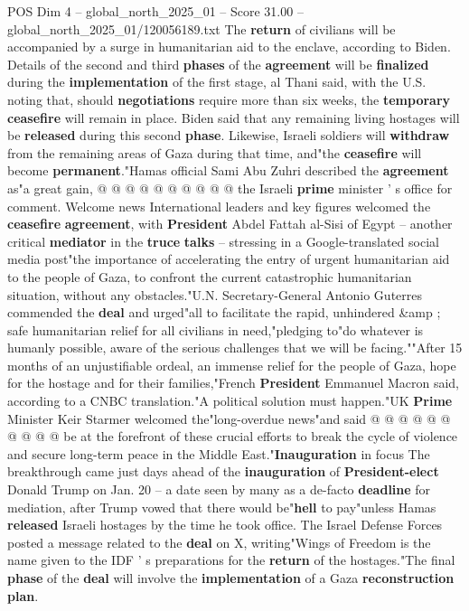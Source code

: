 \begin{textsample}{POS Dim 4 – global\_north\_2025\_01 – Score 31.00 – global\_north\_2025\_01/120056189.txt}
The \textbf{return} of civilians will be accompanied by a surge in humanitarian aid to the enclave, according to Biden.
Details of the second and third \textbf{phases} of the \textbf{agreement} will be \textbf{finalized} during the \textbf{implementation} of the first stage, al Thani said, with the U.S. noting that, should \textbf{negotiations} require more than six weeks, the \textbf{temporary} \textbf{ceasefire} will remain in place.
Biden said that any remaining living hostages will be \textbf{released} during this second \textbf{phase}.
Likewise, Israeli soldiers will \textbf{withdraw} from the remaining areas of Gaza during that time, and"the \textbf{ceasefire} will become \textbf{permanent}."Hamas official Sami Abu Zuhri described the \textbf{agreement} as"a great gain, @ @ @ @ @ @ @ @ @ @ the Israeli \textbf{prime} minister ' s office for comment.
Welcome news International leaders and key figures welcomed the \textbf{ceasefire} \textbf{agreement}, with \textbf{President} Abdel Fattah al-Sisi of Egypt -- another critical \textbf{mediator} in the \textbf{truce} \textbf{talks} -- stressing in a Google-translated social media post"the importance of accelerating the entry of urgent humanitarian aid to the people of Gaza, to confront the current catastrophic humanitarian situation, without any obstacles."U.N.
Secretary-General Antonio Guterres commended the \textbf{deal} and urged"all to facilitate the rapid, unhindered \&amp ; safe humanitarian relief for all civilians in need,"pledging to"do whatever is humanly possible, aware of the serious challenges that we will be facing.""After 15 months of an unjustifiable ordeal, an immense relief for the people of Gaza, hope for the hostage and for their families,"French \textbf{President} Emmanuel Macron said, according to a CNBC translation."A political solution must happen."UK \textbf{Prime} Minister Keir Starmer welcomed the"long-overdue news"and said @ @ @ @ @ @ @ @ @ @ be at the forefront of these crucial efforts to break the cycle of violence and secure long-term peace in the Middle East."\textbf{Inauguration} in focus The breakthrough came just days ahead of the \textbf{inauguration} of \textbf{President-elect} Donald Trump on Jan. 20 -- a date seen by many as a de-facto \textbf{deadline} for mediation, after Trump vowed that there would be"\textbf{hell} to pay"unless Hamas \textbf{released} Israeli hostages by the time he took office.
The Israel Defense Forces posted a message related to the \textbf{deal} on X, writing"Wings of Freedom is the name given to the IDF ' s preparations for the \textbf{return} of the hostages."The final \textbf{phase} of the \textbf{deal} will involve the \textbf{implementation} of a Gaza \textbf{reconstruction} \textbf{plan}.

\end{textsample}
